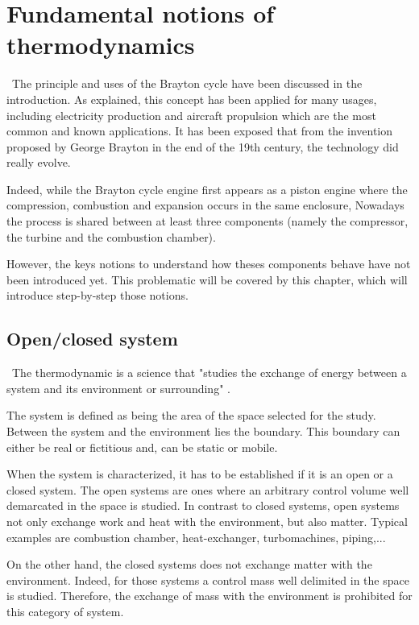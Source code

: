 \graphicspath{{Chapitre_2/Images/}}
\chapter{Fundamental notions of thermodynamics}\label{C2}
\quad\, The principle and uses of the Brayton cycle have been discussed in the introduction. As explained, this concept has been applied for many usages, including electricity production and aircraft propulsion which are the most common and known applications. It has been exposed that from the invention proposed by George Brayton in the end of the 19th century, the technology did really evolve.

Indeed, while the Brayton cycle engine first appears as a  piston engine where the compression, combustion and expansion occurs in the same enclosure, Nowadays 
the process is shared between at least three components (namely the compressor, the turbine and the combustion chamber).

However, the keys notions to understand how theses components behave have not been introduced yet. This problematic will be covered by this chapter, which will introduce step-by-step those notions.
\section{Open/closed system}\label{sect:C2_Sys}
\quad\,  The thermodynamic is a science that "studies the exchange of energy between a system and its environment or surrounding" \cite{thermoApp_1}.

The system is defined as being the area of the space selected for the study. Between the system and the environment lies the boundary. This boundary can either be real or fictitious and, can be static or mobile.

When the system is characterized, it has to be established if it is an open or a closed system.
The open systems are ones where an arbitrary control volume well demarcated in the space is studied. In contrast to closed systems, open systems not only exchange work and heat with the environment, but also matter. Typical examples are combustion chamber, heat-exchanger, turbomachines, piping,...

On the other hand, the closed systems does not exchange matter with the environment. Indeed, 
for those systems a control mass well delimited in the space is studied. Therefore, the exchange of mass with the environment is prohibited for this category of system. 

